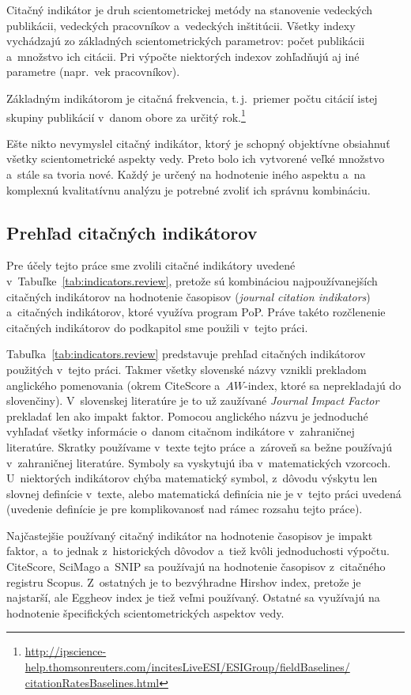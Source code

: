 Citačný indikátor je druh scientometrickej metódy na stanovenie 
vedeckých publikácii, vedeckých pracovníkov a~vedeckých inštitúcii.  Všetky
indexy vychádzajú zo základných scientometrických parametrov: počet publikácii
a~množstvo ich citácii.  Pri výpočte niektorých indexov zohľadňujú aj iné
parametre (napr.~vek pracovníkov).

Základným indikátorom je citačná frekvencia, t.\,j.~priemer počtu citácií istej
skupiny publikácií v~danom obore za určitý
rok.\footnote{\url{http://ipscience-help.thomsonreuters.com/incitesLiveESI/ESIGroup/fieldBaselines/
    citationRatesBaselines.html}}

Ešte nikto nevymyslel citačný indikátor, ktorý je schopný objektívne obsiahnuť
všetky scientometrické aspekty vedy.  Preto bolo ich vytvorené veľké množstvo
a~stále sa tvoria nové.  Každý je určený na hodnotenie iného aspektu a~na
komplexnú kvalitatívnu analýzu je potrebné zvoliť ich správnu kombináciu.

\subsection{Prehľad citačných indikátorov}

Pre účely tejto práce sme zvolili citačné indikátory uvedené
v~Tabuľke~\ref{tab:indicators.review}, pretože sú kombináciou najpoužívanejších
citačných indikátorov na hodnotenie časopisov (\emph{journal citation
  indikators}) a~citačných indikátorov, ktoré využíva program PoP.  Práve takéto rozčlenenie citačných indikátorov do podkapitol sme
použili v~tejto práci.

Tabuľka~\ref{tab:indicators.review} predstavuje prehľad citačných indikátorov
použitých v~tejto práci.  Takmer všetky slovenské názvy vznikli prekladom
anglického pomenovania (okrem CiteScore a~$AW$-index, ktoré sa neprekladajú do
slovenčiny).  V~slovenskej literatúre je to už zaužívané \emph{Journal Impact
  Factor} prekladať len ako impakt faktor.  Pomocou anglického názvu je
jednoduché vyhľadať všetky informácie o~danom citačnom indikátore v~zahraničnej
literatúre.  Skratky používame v~texte tejto práce a~zároveň sa bežne používajú
v~zahraničnej literatúre.  Symboly sa vyskytujú iba v~matematických vzorcoch.
U~niektorých indikátorov chýba matematický symbol, z~dôvodu výskytu len slovnej
definície v~texte, alebo matematická definícia nie je v~tejto práci uvedená
(uvedenie definície je pre komplikovanosť nad rámec rozsahu tejto práce).

Najčastejšie používaný citačný indikátor na hodnotenie časopisov je impakt
faktor, a~to jednak z~historických dôvodov a~tiež kvôli jednoduchosti výpočtu.
CiteScore, SciMago a~SNIP sa používajú na hodnotenie časopisov z~citačného
registru Scopus.  Z~ostatných je to bezvýhradne Hirshov index, pretože je
najstarší, ale Eggheov index je tiež veľmi používaný.  Ostatné sa využívajú na
hodnotenie špecifických scientometrických aspektov vedy.


